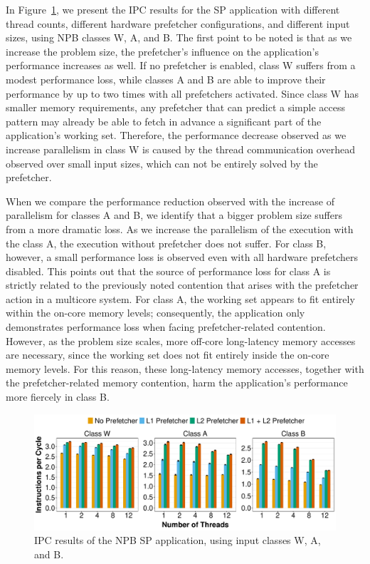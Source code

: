 \documentclass[AMA,final,STIX1COL]{WileyNJD-v2}
\begin{document}
In Figure~\ref{fig:nas_wab}, we present the IPC results for the SP application with different thread counts, different hardware prefetcher configurations, and different input sizes, using NPB classes W, A, and B.
The first point to be noted is that as we increase the problem size, the prefetcher's influence on the application's performance increases as well. 
If no prefetcher is enabled, class W suffers from a modest performance loss, while classes A and B are able to improve their performance by up to two times with all prefetchers activated.
Since class W has smaller memory requirements, any prefetcher that can predict a simple access pattern may already be able to fetch in advance a significant part of the application's working set.
Therefore, the performance decrease observed as we increase parallelism in class W is caused by the thread communication overhead observed over small input sizes, which can not be entirely solved by the prefetcher.


When we compare the performance reduction observed with the increase of parallelism for classes A and B, we identify that a bigger problem size suffers from a more dramatic loss.
As we increase the parallelism of the execution with the class A, the execution without prefetcher does not suffer.
For class B, however, a small performance loss is observed even with all hardware prefetchers disabled.
This points out that the source of performance loss for class A is strictly related to the previously noted contention that arises with the prefetcher action in a multicore system.
For class A, the working set appears to fit entirely within the on-core memory levels; consequently, the application only demonstrates performance loss when facing prefetcher-related contention.
However, as the problem size scales, more off-core long-latency memory accesses are necessary, since the working set does not fit entirely inside the on-core memory levels.
For this reason, these long-latency memory accesses, together with the prefetcher-related memory contention, harm the application's performance more fiercely in class B.


\begin{figure}
    \centering
    \includegraphics[width=\linewidth]{figures/fig6.pdf}
    \caption{IPC results of the NPB SP application, using input classes W, A, and B.}
    \label{fig:nas_wab}
\end{figure}
\end{document}
